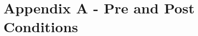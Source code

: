 \newpage
\section{Appendix A - Pre and Post Conditions} \label{sec:AppendixA}
\setcounter{subsection}{0}